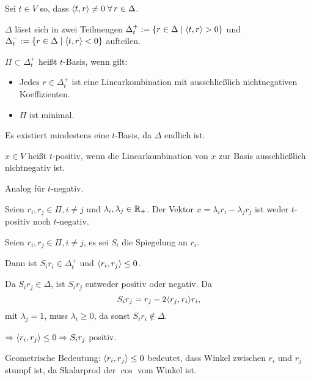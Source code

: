 \documentclass[12pt]{extarticle}
\begin{document}
\begin{defi}
    Sei \( t \in V \) so, dass \( \scalarprod{t}{r} \neq 0 
    \; \forall r \in \Delta \).

    \( \Delta \) lässt sich in zwei Teilmengen 
    \( \Delta_t^+ := 
    \{r \in \Delta \;\vert \; \langle t, r \rangle > 0\} \) 
    und \( \Delta_t^- := 
    \{r \in \Delta \;\vert \; \langle t, r \rangle < 0\} \) 
    aufteilen. 
\end{defi}

\begin{defi}[\( t \)-Basis]
    \( \Pi \subset \Delta_t^+ \) heißt \( t \)-Basis, 
    wenn gilt:
    \begin{itemize}
        \item Jedes \( r \in \Delta_t^+ \) ist 
        eine Linearkombination mit ausschließlich 
        nichtnegativen Koeffizienten.
        \item \( \Pi \) ist minimal.
    \end{itemize}
    Es existiert mindestens eine \( t \)-Basis, 
    da \( \Delta \) endlich ist.
\end{defi}

\begin{defi}[\( t \)-positiv]
    \( x \in V \) heißt \(t\)-positiv, wenn 
    die Linearkombination von \(x\) zur 
    Basis ausschließlich nichtnegativ ist.

    Analog für \( t \)-negativ.
\end{defi}

\begin{satz} %
    Seien \( r_i, r_j \in \Pi, i \neq j \) und 
    \( \lambda_i, \lambda_j \in \mathbb{R}_+ \). 
    Der Vektor \( x = \lambda_i r_i - \lambda_j r_j \) 
    ist weder \( t \)-positiv noch \( t \)-negativ.
\end{satz}

\begin{satz} %
    Seien \( r_i, r_j \in \Pi, i \neq j \), es 
    sei \( S_i \) die Spiegelung an \( r_i \). 

    Dann ist \( S_i r_i \in \Delta_t^+ \) und 
    \( \langle r_i, r_j \rangle \leq 0 \).
\end{satz}
\begin{bew}
    Da \( S_i r_j \in \Delta \), ist \( S_i r_j \) 
    entweder positiv oder negativ. Da 
    \[ S_i r_j = r_j - 2 \langle r_j, r_i \rangle r_i, \]
    mit \( \lambda_j = 1 \), muss 
    \( \lambda_i \geq 0 \), da sonst 
    \( S_i r_i \notin \Delta \). 

    \( \Rightarrow \langle r_i, r_j \rangle \leq 0 
    \Rightarrow S_i r_j \) 
    positiv.
\end{bew}
\begin{bem}
    Geometrische Bedeutung:
    \( \langle r_i, r_j \rangle \leq 0 \) bedeutet, 
    dass Winkel zwischen \(r_i\) und \(r_j\) 
    stumpf ist, da Skalarprod der \(\cos \) 
    vom Winkel ist.
\end{bem}
\end{document}
